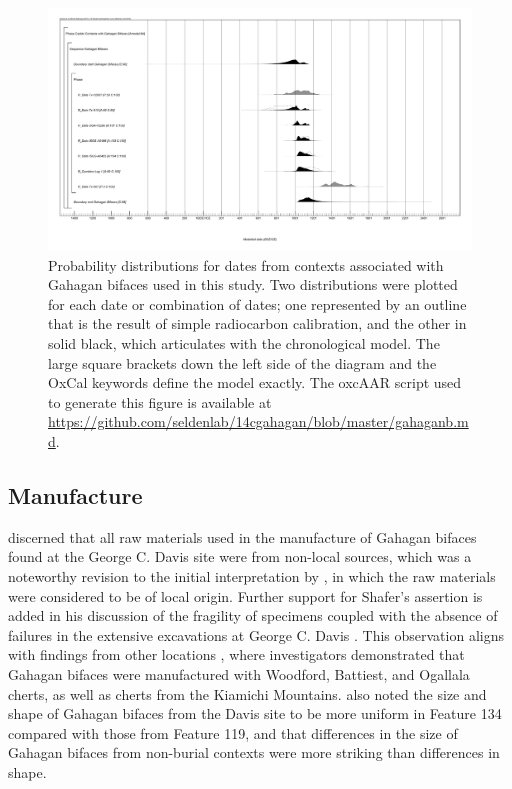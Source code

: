 \documentclass[review]{elsarticle}
\begin{document}
\begin{figure}[ht]\centering
\includegraphics[width=\linewidth]{fig03}
\caption{Probability distributions for dates from contexts associated with Gahagan bifaces used in this study. Two distributions were plotted for each date or combination of dates; one represented by an outline that is the result of simple radiocarbon calibration, and the other in solid black, which articulates with the chronological model. The large square brackets down the left side of the diagram and the OxCal keywords define the model exactly. The oxcAAR script used to generate this figure is available at \href{https://github.com/seldenlab/14cgahagan/blob/master/gahaganb.md}{https://github.com/seldenlab/14cgahagan/blob/master/gahaganb.md}.}
\label{fig:fig3}
\end{figure}

\subsection*{Manufacture}

\citet{RN3684} discerned that all raw materials used in the manufacture of Gahagan bifaces found at the George C. Davis site were from non-local sources, which was a noteworthy revision to the initial interpretation by \citet{RN800}, in which the raw materials were considered to be of local origin. Further support for Shafer’s assertion is added in his discussion of the fragility of specimens coupled with the absence of failures in the extensive excavations at George C. Davis \citep{RN3684}. This observation aligns with findings from other locations \citep{RN1001}, where investigators demonstrated that Gahagan bifaces were manufactured with Woodford, Battiest, and Ogallala cherts, as well as cherts from the Kiamichi Mountains. \citet{RN3684} also noted the size and shape of Gahagan bifaces from the Davis site to be more uniform in Feature 134 compared with those from Feature 119, and that differences in the size of Gahagan bifaces from non-burial contexts were more striking than differences in shape.
\end{document}
